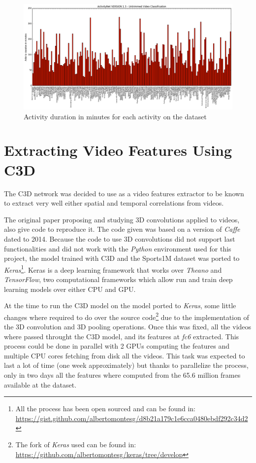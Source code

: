\begin{figure}
\begin{center}
\includegraphics[width=1\linewidth]{img/methodology/dataset_stats}
\end{center}
\caption{Activity duration in minutes for each activity on the dataset}
\label{fig:dataset_stats}
\end{figure}

\section{Extracting Video Features Using C3D}

The C3D network\cite{tran2014learning} was decided to use as a video features extractor to be known to extract very well either spatial and temporal correlations from videos.

The original paper proposing and studying 3D convolutions applied to videos, also give code to reproduce it. The code given was based on a version of \textit{Caffe}\cite{jia2014caffe} dated to 2014. Because the code to use 3D convolutions did not support last functionalities and did not work with the \textit{Python} environment used for this project, the model trained with C3D and the Sports1M dataset was ported to \textit{Keras}\footnote{All the process has been open sourced and can be found in: \url{https://gist.github.com/albertomontesg/d8b21a179c1e6cca0480ebdf292c34d2}}. Keras is a deep learning framework that works over \textit{Theano}\cite{theano2016theano} and \textit{TensorFlow}\cite{abadi2016tensorflow}, two computational frameworks which allow run and train deep learning models over either CPU and GPU.

At the time to run the C3D model on the model ported to \textit{Keras}, some little changes where required to do over the source code\footnote{The fork of \textit{Keras} used can be found in: \url{https://github.com/albertomontesg/keras/tree/develop}} due to the implementation of the 3D convolution and 3D pooling operations. Once this was fixed, all the videos where passed throught the C3D model, and its features at \textit{fc6} extracted. This process could be done in parallel with 2 GPUs computing the features and multiple CPU cores fetching from disk all the videos. This task was expected to last a lot of time (one week approximately) but thanks to parallelize the process, only in two days all the features where computed from the 65.6 million frames available at the dataset.

